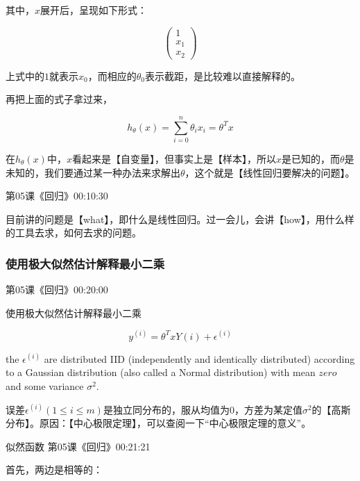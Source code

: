 \documentclass[UTF8]{ctexart}
\begin{document}
其中，$x$展开后，呈现如下形式：

\[ \left( \begin{array}{c}
1 \\
x_{1} \\
x_{2} \end{array} \right)\]

上式中的$1$就表示$x_{0}$，而相应的$\theta_{0}$表示截距，是比较难以直接解释的。



再把上面的式子拿过来，

\begin{displaymath}
h_{\theta}(x)=\sum_{i=0}^{n}\theta_{i}x_{i}=\theta^{T}x
\end{displaymath}

在$h_{\theta}(x)$中，$x$看起来是【自变量】，但事实上是【样本】，所以$x$是已知的，而$\theta$是未知的，我们要通过某一种办法来求解出$\theta$，这个就是【线性回归要解决的问题】。

第05课《回归》00:10:30

目前讲的问题是【what】，即什么是线性回归。过一会儿，会讲【how】，用什么样的工具去求，如何去求的问题。

\subsubsection{使用极大似然估计解释最小二乘}

第05课《回归》00:20:00

使用极大似然估计解释最小二乘

\begin{displaymath}
y^{(i)}=\theta^{T}xY{(i)}+\epsilon^{(i)}
\end{displaymath}

the $\epsilon^{(i)}$ are distributed IID (independently and identically distributed) according to a Gaussian distribution (also called a Normal distribution) with mean $zero$ and some variance $\sigma^{2}$.

误差$\epsilon^{(i)}(1 \leq i \leq m)$是独立同分布的，服从均值为$0$，方差为某定值$\sigma^{2}$的【高斯分布】。原因：【中心极限定理】，可以查阅一下“中心极限定理的意义”。

似然函数 第05课《回归》00:21:21

首先，两边是相等的：
\end{document}
